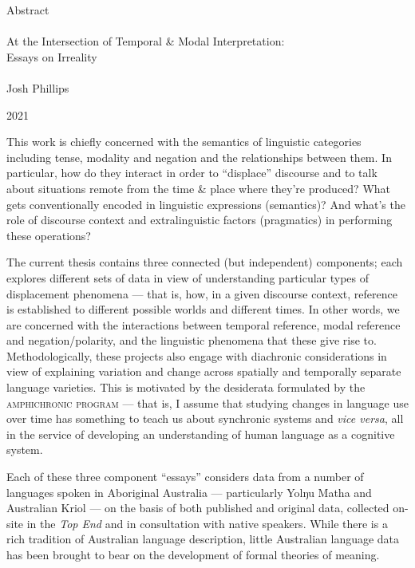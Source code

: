 {\sf\begin{center}
	Abstract\\
	
	\mbox{}\\
	
	{\Large At the Intersection of Temporal \& Modal Interpretation:}\\
	
	{\large Essays on Irreality}\\
	
	\mbox{}\\
	
	Josh Phillips
	
	2021
\end{center}\doublespacing
{}
\noindent This work is chiefly concerned with the semantics of linguistic categories including tense, modality and negation and the relationships between them. In particular, how do they interact in order to ``displace'' discourse and to talk about situations remote from the time \& place where they're produced? What gets conventionally encoded in linguistic expressions (semantics)? And what's the role of discourse context and extralinguistic factors (pragmatics) in performing these operations?

The current thesis contains three connected (but independent) components; each explores different sets of data in view of understanding particular types of displacement phenomena --- that is, how, in a given discourse context, reference is established to different possible worlds and different times. In other words, we are concerned with the interactions between temporal reference, modal reference and negation/polarity, and the linguistic phenomena that these give rise to. Methodologically, these projects also engage with diachronic considerations in view of explaining variation and change across spatially and temporally separate language varieties. This is motivated by the desiderata formulated by the \textsc{amphichronic program} --- that is, I assume that studying changes in language use over time has something to teach us about synchronic systems and \textit{vice versa}, all in the service of developing an understanding of human language as a cognitive system.


Each of these three component ``essays'' considers data from a number of languages spoken in Aboriginal Australia --- particularly Yolŋu Matha and Australian Kriol --- on the basis of both published and original data, collected on-site in the \textit{Top End} and in consultation with native speakers. While there is a rich tradition of Australian language description, little Australian language data has been brought to bear on the development of formal theories of meaning. 

}
